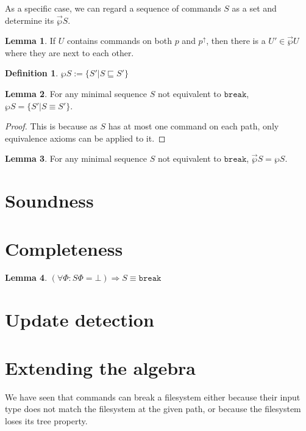 \documentclass[12pt]{article}
\newcommand{\empt}{\bot}
\newcommand{\FS}{\Phi} %
\newcommand{\pp}{p^\uparrow} %
\newcommand{\cbrk}{\mathtt{break}}
\newcommand{\eqext}{\sqsubseteq}
\newcommand{\extset}[1]{\wp{#1}}
\newcommand{\orderset}[1]{\vec{\wp}{#1}}
\theoremstyle{definition}
\newtheorem{mydef}{Definition}
\newtheorem{mylem}{Lemma}
\begin{document}
As a specific case, we can regard a sequence of commands $S$
as a set and determine its $\orderset{S}$.

\begin{mylem}\label{lemma:neighbour}
If $U$ contains commands on both $p$ and $\pp$, then
there is a $U'\in\orderset{U}$ where they are next to each other.
\end{mylem}

\begin{mydef}
$\extset{S} := \{S'|S\eqext S'\}$
\end{mydef}

\begin{mylem}\label{lemma:minextset}
For any minimal sequence $S$ not equivalent to $\cbrk$, $\extset{S} = \{S'|S\equiv S'\}$.
\end{mylem}
\begin{proof}
This is because as $S$ has at most one command on each path, only equivalence axioms
can be applied to it.
\end{proof}

\begin{mylem}\label{lemma:minextorder}
For any minimal sequence $S$ not equivalent to $\cbrk$,
$\orderset{S} = \extset{S}$.
\end{mylem}


\section{Soundness}

\section{Completeness}

\begin{mylem}
\((\forall\FS: S\FS = \empt) \Rightarrow S \equiv \cbrk\)
\end{mylem}

\section{Update detection}

\section{Extending the algebra}

We have seen that commands can break a filesystem
either because their input type does not match the filesystem at the given path,
or because the filesystem loses its tree property.
\end{document}
